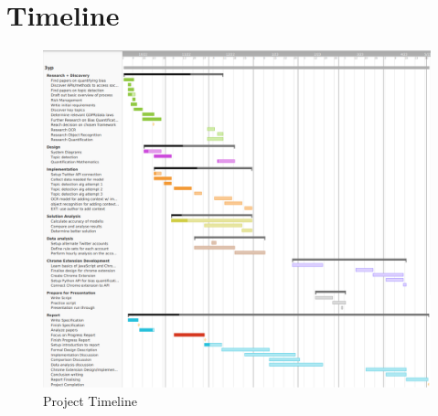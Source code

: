 \documentclass[a4paper,fleqn,10pt]{article}
\begin{document}
\section{Timeline}
\label{sec:timeline}
\begin{figure}[htbp]
    \includegraphics[width=150mm]{../images/3yp timeline v3.png}
    \caption{Project Timeline}
    \label{fig:timeline}
\end{figure}
\end{document}
